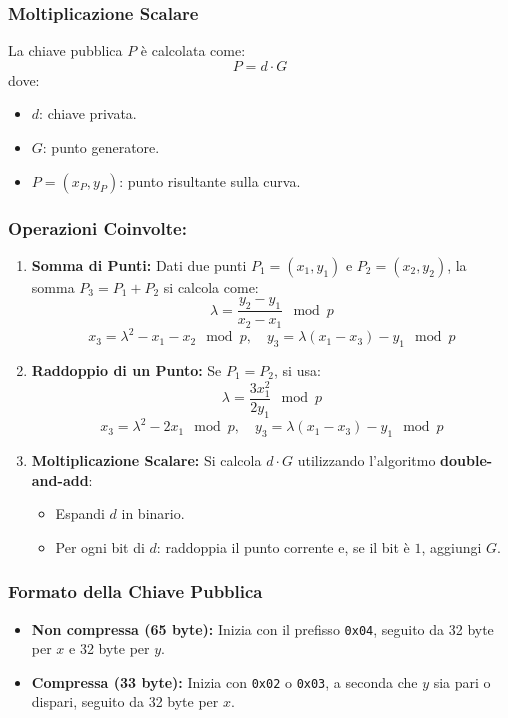 \documentclass[a4paper,12pt]{article}
\begin{document}
\subsubsection*{Moltiplicazione Scalare}
La chiave pubblica \(P\) è calcolata come:
\[
P = d \cdot G
\]
dove:
\begin{itemize}
    \item \(d\): chiave privata.
    \item \(G\): punto generatore.
    \item \(P = (x_P, y_P)\): punto risultante sulla curva.
\end{itemize}

\subsubsection*{Operazioni Coinvolte:}
\begin{enumerate}
    \item \textbf{Somma di Punti:} Dati due punti \(P_1 = (x_1, y_1)\) e \(P_2 = (x_2, y_2)\), la somma \(P_3 = P_1 + P_2\) si calcola come:
    \[
    \lambda = \frac{y_2 - y_1}{x_2 - x_1} \mod p
    \]
    \[
    x_3 = \lambda^2 - x_1 - x_2 \mod p, \quad y_3 = \lambda (x_1 - x_3) - y_1 \mod p
    \]
    \item \textbf{Raddoppio di un Punto:} Se \(P_1 = P_2\), si usa:
    \[
    \lambda = \frac{3x_1^2}{2y_1} \mod p
    \]
    \[
    x_3 = \lambda^2 - 2x_1 \mod p, \quad y_3 = \lambda (x_1 - x_3) - y_1 \mod p
    \]
    \item \textbf{Moltiplicazione Scalare:} Si calcola \(d \cdot G\) utilizzando l'algoritmo \textbf{double-and-add}:
    \begin{itemize}
        \item Espandi \(d\) in binario.
        \item Per ogni bit di \(d\): raddoppia il punto corrente e, se il bit è \(1\), aggiungi \(G\).
    \end{itemize}
\end{enumerate}

\subsubsection*{Formato della Chiave Pubblica}
\begin{itemize}
    \item \textbf{Non compressa (65 byte):} Inizia con il prefisso \texttt{0x04}, seguito da 32 byte per \(x\) e 32 byte per \(y\).
    \item \textbf{Compressa (33 byte):} Inizia con \texttt{0x02} o \texttt{0x03}, a seconda che \(y\) sia pari o dispari, seguito da 32 byte per \(x\).
\end{itemize}
\end{document}
